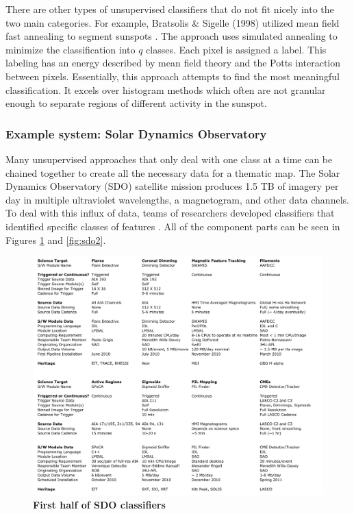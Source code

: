 \documentclass[twoside]{report}
\begin{document}
There are other types of unsupervised classifiers that do not fit nicely into the two main categories. For example, Bratsolis \& Sigelle (1998) utilized mean field fast annealing to segment sunspots \cite{bratsolis1998solar}. The approach uses simulated annealing to minimize the classification into $q$ classes. Each pixel is assigned a label. This labeling has an energy described by mean field theory and the Potts interaction between pixels. Essentially, this approach attempts to find the most meaningful classification. It excels over histogram methods which often are not granular enough to separate regions of different activity in the sunspot.

\subsubsection{Example system: Solar Dynamics Observatory}
Many unsupervised approaches that only deal with one class at a time can be chained together to create all the necessary data for a thematic map. The Solar Dynamics Observatory (SDO) satellite mission produces 1.5 TB of imagery per day in multiple ultraviolet wavelengths, a magnetogram, and other data channels. To deal with this influx of data, teams of researchers developed classifiers that identified specific classes of features \cite{sdo}. All of the component parts can be seen in Figures \ref{fig:sdo1} and \ref{fig:sdo2}.

\begin{figure}[H]
  \begin{center}
    \includegraphics[scale=0.4]{sdo1.png}
    \caption{{\bf First half of SDO classifiers} \cite{sdo}}
    \label{fig:sdo1}
 \end{center}
\end{figure}
\end{document}
